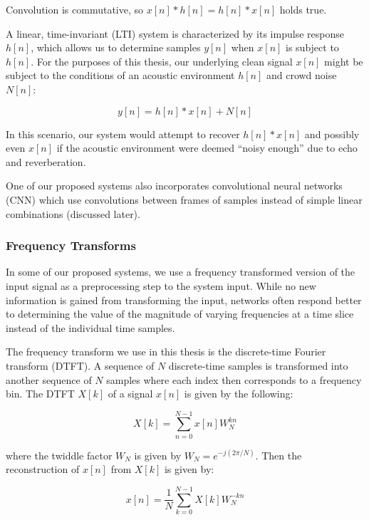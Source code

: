 Convolution is commutative, so $x[n] * h[n] = h[n] * x[n]$ holds true.

A linear, time-invariant (LTI) system is characterized by its impulse response $h[n]$, which allows us to determine samples $y[n]$ when $x[n]$ is subject to $h[n]$. For the purposes of this thesis, our underlying clean signal $x[n]$ might be subject to the conditions of an acoustic environment $h[n]$ and crowd noise $N[n]$:

\begin{equation}
y[n] = h[n]*x[n]+N[n]
\end{equation}

In this scenario, our system would attempt to recover $h[n]*x[n]$ and possibly even $x[n]$ if the acoustic environment were deemed ``noisy enough'' due to echo and reverberation.

One of our proposed systems also incorporates convolutional neural networks (CNN) which use convolutions between frames of samples instead of simple linear combinations (discussed later).

\subsubsection{Frequency Transforms} %
In some of our proposed systems, we use a frequency transformed version of the input signal as a preprocessing step to the system input. While no new information is gained from transforming the input, networks often respond better to determining the value of the magnitude of varying frequencies at a time slice instead of the individual time samples.

The frequency transform we use in this thesis is the discrete-time Fourier transform (DTFT). A sequence of $N$ discrete-time samples is transformed into another sequence of $N$ samples where each index then corresponds to a frequency bin. The DTFT $X[k]$ of a signal $x[n]$ is given by the following:

\begin{equation}
X[k] = \sum_{n=0}^{N-1} x[n] W_N^{kn}
\end{equation}

where the twiddle factor $W_N$ is given by $W_N=e^{-j(2\pi/N)}$. Then the reconstruction of $x[n]$ from $X[k]$ is given by:

\begin{equation}
x[n]=\dfrac{1}{N} \sum_{k=0}^{N-1} X[k] W_N^{-kn}
\end{equation}

